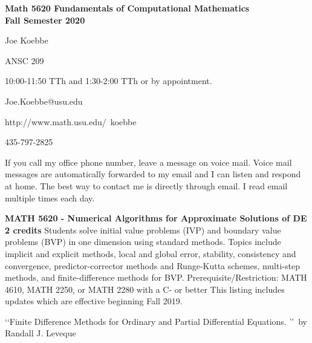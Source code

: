 
\setlength{\oddsidemargin}{-0.25in}
\setlength{\textwidth}{7.0in}
\setlength{\headheight}{0.0in}
\setlength{\topmargin}{-0.25in}
\setlength{\textheight}{9.0in}



\pagestyle{empty}

\noindent
{\Large{\bf
  \noindent Math 5620 Fundamentals of Computational Mathematics
  \ \\
  \noindent Fall Semester 2020
}}

\medskip

 Joe Koebbe

 ANSC 209

 10:00-11:50 TTh and 1:30-2:00 TTh or by
appointment.

 Joe.Koebbe@usu.edu

 http://www.math.usu.edu/~koebbe

 435-797-2825 

\medskip

 If you call my office phone
number, leave a message on voice mail. Voice mail messages are automatically
forwarded to my email and I can listen and respond at home. The best way to
contact me is directly through email. I read email multiple times each day.

\bigskip


\medskip

\noindent
{\bf MATH 5620 - Numerical Algorithms for Approximate Solutions of DE 2 credits}
Students solve initial value problems (IVP) and boundary value problems (BVP) in
one dimension using standard methods. Topics include implicit and explicit
methods, local and global error, stability, consistency and convergence,
predictor-corrector methods and Runge-Kutta schemes, multi-step methods, and
finite-difference methods for BVP.  Prerequisite/Restriction: MATH 4610,
MATH 2250, or MATH 2280 with a C- or better
\noindent
This listing includes updates which are effective beginning Fall 2019.

\bigskip

 \lq\lq Finite Difference Methods for Ordinary and
Partial Differential Equations. \rq\rq\ by Randall J. Leveque

